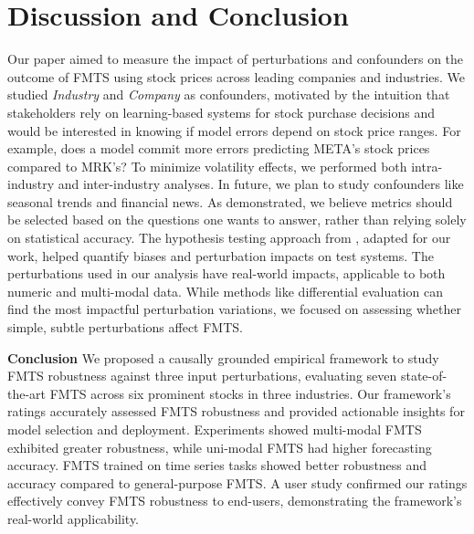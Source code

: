 \section{Discussion and Conclusion}

Our paper aimed to measure the impact of perturbations and confounders on the outcome of FMTS using stock prices across leading companies and industries. We studied \textit{Industry} and \textit{Company} as confounders, motivated by the intuition that stakeholders rely on learning-based systems for stock purchase decisions and would be interested in knowing if model errors depend on stock price ranges. For example, does a model commit more errors predicting META's stock prices compared to MRK's? To minimize volatility effects, we performed both intra-industry and inter-industry analyses. In future, we plan to study confounders like seasonal trends and financial news.
As demonstrated, we believe metrics should be selected based on the questions one wants to answer, rather than relying solely on statistical accuracy. The hypothesis testing approach from \cite{kausik2024rating}, adapted for our work, helped quantify biases and perturbation impacts on test systems. 
The perturbations used in our analysis have real-world impacts, applicable to both numeric and multi-modal data. While methods like differential evaluation can find the most impactful perturbation variations, we focused on assessing whether simple, subtle perturbations affect FMTS.

\noindent \textbf{Conclusion} We proposed a causally grounded empirical framework to study FMTS robustness against three input perturbations, evaluating seven state-of-the-art FMTS across six prominent stocks in three industries. Our framework's ratings accurately assessed FMTS robustness and provided actionable insights for model selection and deployment. Experiments showed multi-modal FMTS exhibited greater robustness, while uni-modal FMTS had higher forecasting accuracy. FMTS trained on time series tasks showed better robustness and accuracy compared to general-purpose FMTS. A user study confirmed our ratings effectively convey FMTS robustness to end-users, demonstrating the framework's real-world applicability.

